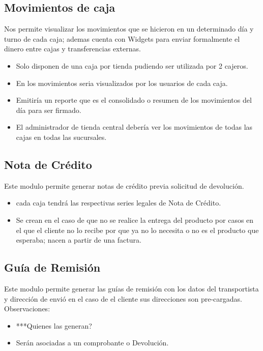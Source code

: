 \documentclass[pdftex,12pt,oneside,a4paper,spanish, english, brazil]{abntex2}
\begin{document}
\begin{sloppypar}
              \subsection{Movimientos de caja}
              Nos permite visualizar los movimientos que se hicieron en un determinado día y turno de cada caja; ademas cuenta con Widgets para enviar formalmente el dinero entre cajas y transferencias externas.
              \begin{itemize}
              	\item Solo disponen de una caja por tienda pudiendo ser utilizada por 2 cajeros.
              	\item En los movimientos seria visualizados por los usuarios de cada caja.
              	\item Emitiría un reporte que es el consolidado o resumen de los movimientos del día para ser firmado.
              	\item El administrador de tienda central debería ver los movimientos de todas las cajas en todas las sucursales.
              \end{itemize}
              \subsection{Nota de Crédito}
              Este modulo permite generar notas de crédito previa solicitud de devolución.
              \begin{itemize}
              	\item cada caja tendrá las respectivas series legales de Nota de Crédito.
              	\item Se crean en el caso de que no se realice la entrega del producto por casos en el que el cliente no lo recibe por que ya no lo necesita o no es el producto que esperaba; nacen a partir de una factura.
              \end{itemize}
              \subsection{Guía de Remisión}
              Este modulo permite generar las guías de remisión con los datos del transportista y dirección de envió en el caso de el cliente sus direcciones son pre-cargadas.\\
              Observaciones:
              \begin{itemize}
              	\item ***Quienes las generan?
              	\item Serán asociadas a un comprobante o Devolución.
              \end{itemize}

\end{sloppypar}
\end{document}
